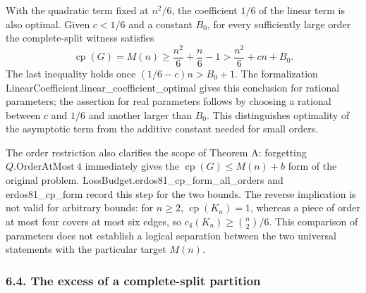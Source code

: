 \documentclass[english,11pt,a4paper]{article}
\begin{document}
With the quadratic term fixed at \(n^2/6\), the coefficient \(1/6\) of the linear term is also optimal. Given \(c<1/6\) and a constant \(B_0\), for every sufficiently large order the complete-split witness satisfies \[
\operatorname{cp}(G)=M(n)
\ge\frac{n^2}{6}+\frac n6-1
>\frac{n^2}{6}+cn+B_0.
\tag{6.5}
\] The last inequality holds once \((1/6-c)n>B_0+1\). The formalization {\ttfamily\small LinearCoeffi\discretionary{\hbox{\ensuremath{\hookrightarrow}}}{}{}cient.\discretionary{\hbox{\ensuremath{\hookrightarrow}}}{}{}linear\_\discretionary{\hbox{\ensuremath{\hookrightarrow}}}{}{}coefficient\_\discretionary{\hbox{\ensuremath{\hookrightarrow}}}{}{}optimal} gives this conclusion for rational parameters; the assertion for real parameters follows by choosing a rational between \(c\) and \(1/6\) and another larger than \(B_0\). This distinguishes optimality of the asymptotic term from the additive constant needed for small orders.

The order restriction also clarifies the scope of Theorem A: forgetting \(Q.\mathrm{OrderAtMost}\ 4\) immediately gives the \(\operatorname{cp}(G)\le M(n)+b\) form of the original problem. {\ttfamily\small LossBudget.\discretionary{\hbox{\ensuremath{\hookrightarrow}}}{}{}erdos81\_\discretionary{\hbox{\ensuremath{\hookrightarrow}}}{}{}cp\_\discretionary{\hbox{\ensuremath{\hookrightarrow}}}{}{}form\_\discretionary{\hbox{\ensuremath{\hookrightarrow}}}{}{}all\_\discretionary{\hbox{\ensuremath{\hookrightarrow}}}{}{}orders} and {\ttfamily\small erdos81\_\discretionary{\hbox{\ensuremath{\hookrightarrow}}}{}{}cp\_\discretionary{\hbox{\ensuremath{\hookrightarrow}}}{}{}form} record this step for the two bounds. The reverse implication is not valid for arbitrary bounds: for \(n\ge2\), \(\operatorname{cp}(K_n)=1\), whereas a piece of order at most four covers at most six edges, so \(c_4(K_n)\ge\binom n2/6\). This comparison of parameters does not establish a logical separation between the two universal statements with the particular target \(M(n)\).

\subsubsection{6.4. The excess of a complete-split partition}\label{the-excess-of-a-complete-split-partition}
\end{document}
